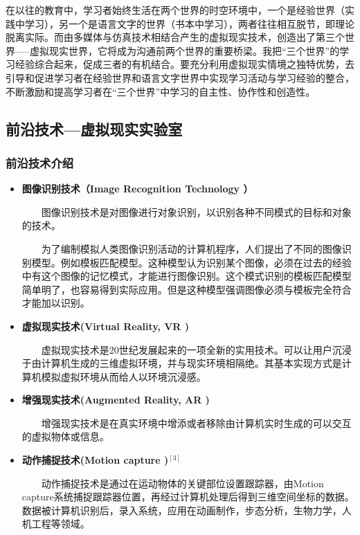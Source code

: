 \documentclass{imutthesis}
\begin{document}
在以往的教育中，学习者始终生活在两个世界的时空环境中，一个是经验世界（实践中学习），另一个是语言文字的世界（书本中学习），两者往往相互脱节，即理论脱离实际。而由多媒体与仿真技术相结合产生的虚拟现实技术，创造出了第三个世界-----虚拟现实世界，它将成为沟通前两个世界的重要桥梁。我把“三个世界”的学习经验综合起来，促成三者的有机结合。要充分利用虚拟现实情境之独特优势，去引导和促进学习者在经验世界和语言文字世界中实现学习活动与学习经验的整合，不断激励和提高学习者在“三个世界”中学习的自主性、协作性和创造性。

\subsection{前沿技术—虚拟现实实验室}
\subsubsection{前沿技术介绍}
\begin{itemize}
    \item \textbf{图像识别技术（Image Recognition Technology
    ）}
  
    $\qquad$图像识别技术是对图像进行对象识别，以识别各种不同模式的目标和对象的技术。

    $\qquad$为了编制模拟人类图像识别活动的计算机程序，人们提出了不同的图像识别模型。例如模板匹配模型。这种模型认为识别某个图像，必须在过去的经验中有这个图像的记忆模式，才能进行图像识别。这个模式识别的模板匹配模型简单明了，也容易得到实际应用。但是这种模型强调图像必须与模板完全符合才能加以识别。

    \item \textbf{虚拟现实技术(Virtual Reality, VR
    )}

    $\qquad$虚拟现实技术是20世纪发展起来的一项全新的实用技术。可以让用户沉浸于由计算机生成的三维虚拟环境，并与现实环境相隔绝。其基本实现方式是计算机模拟虚拟环境从而给人以环境沉浸感。

    \item \textbf{增强现实技术(Augmented Reality, AR
    )}

    $\qquad$增强现实技术是在真实环境中增添或者移除由计算机实时生成的可以交互的虚拟物体或信息。

    \item \textbf{动作捕捉技术(Motion capture
    )$^{[3]}$}

    $\qquad$动作捕捉技术是通过在运动物体的关键部位设置跟踪器，由Motion capture系统捕捉跟踪器位置，再经过计算机处理后得到三维空间坐标的数据。数据被计算机识别后，录入系统，应用在动画制作，步态分析，生物力学，人机工程等领域。

\end{itemize}
\end{document}
